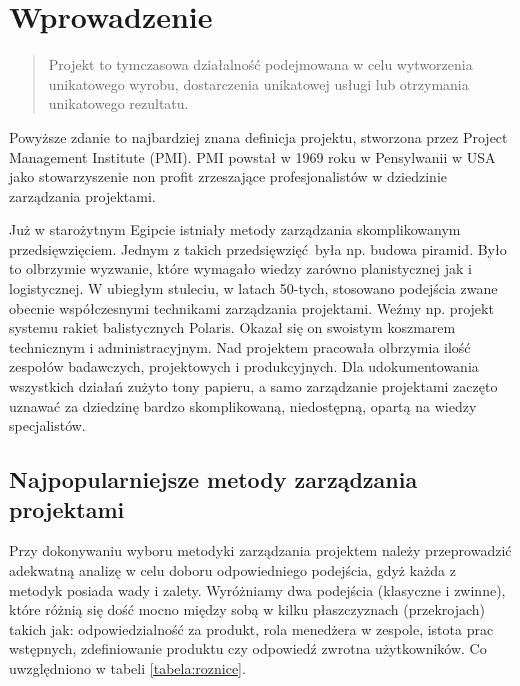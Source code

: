 
\chapter{Wprowadzenie}

\begin{quote}
Projekt to tymczasowa działalność podejmowana w celu wytworzenia unikatowego wyrobu,
dostarczenia unikatowej usługi lub otrzymania unikatowego rezultatu.
~\cite{PMI_2000}
\end{quote}

Powyższe zdanie to najbardziej znana definicja projektu, stworzona przez
Project Management Institute (PMI).
PMI powstał w 1969 roku w Pensylwanii w USA jako stowarzyszenie non profit
zrzeszające profesjonalistów w dziedzinie zarządzania projektami.

Już w starożytnym Egipcie istniały metody zarządzania skomplikowanym przedsięwzięciem.
Jednym z takich przedsięwzięć była np. budowa piramid.
Było to olbrzymie wyzwanie, które wymagało wiedzy zarówno planistycznej jak i logistycznej.
W ubiegłym stuleciu, w latach 50-tych, stosowano podejścia zwane obecnie współczesnymi
technikami zarządzania projektami. Weźmy np. projekt systemu rakiet balistycznych Polaris.
Okazał się on swoistym koszmarem technicznym i administracyjnym.
Nad projektem pracowała olbrzymia ilość zespołów badawczych, projektowych i produkcyjnych.
Dla udokumentowania wszystkich działań zużyto tony papieru,
a samo zarządzanie projektami zaczęto uznawać za dziedzinę bardzo skomplikowaną,
niedostępną, opartą na wiedzy specjalistów.
\cite{Stanley_2013}

\section{Najpopularniejsze metody zarządzania projektami}
Przy dokonywaniu wyboru metodyki zarządzania projektem należy przeprowadzić
adekwatną analizę w celu doboru odpowiedniego podejścia,
gdyż każda z metodyk posiada wady i zalety.
Wyróżniamy dwa podejścia (klasyczne i zwinne), które różnią się dość mocno między sobą
w kilku płaszczyznach (przekrojach) takich jak:
odpowiedzialność za produkt, rola menedżera w zespole, istota prac wstępnych,
zdefiniowanie produktu czy odpowiedź zwrotna użytkowników.
Co uwzględniono w tabeli \ref{tabela:roznice}.

